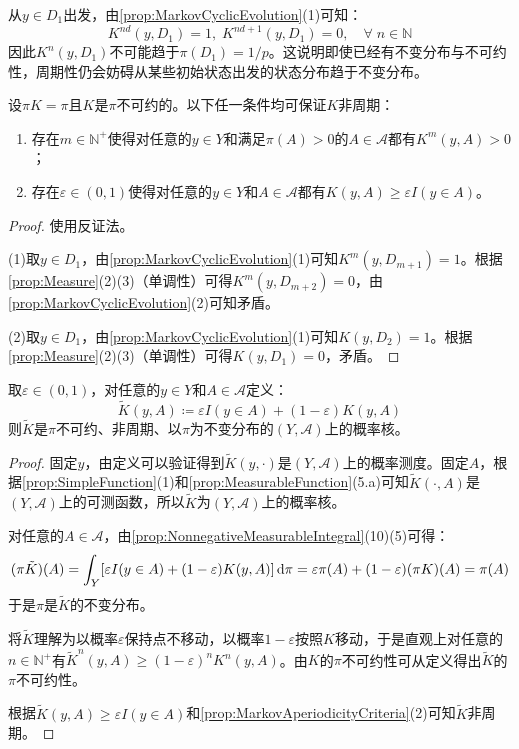 从$y\in D_1$出发，由\cref{prop:MarkovCyclicEvolution}(1)可知：
\begin{equation*}
	K^{nd}(y,D_1)=1,\;K^{nd+1}(y,D_1)=0,\quad\forall\;n\in\mathbb{N}
\end{equation*}
因此$K^n(y,D_1)$不可能趋于$\pi(D_1)=1/p$。这说明即使已经有不变分布与不可约性，周期性仍会妨碍从某些初始状态出发的状态分布趋于不变分布。
\begin{property}\label{prop:MarkovAperiodicityCriteria}
	设$\pi K=\pi$且$K$是$\pi$不可约的。以下任一条件均可保证$K$非周期：
	\begin{enumerate}
		\item 存在$m\in\mathbb{N}^+$使得对任意的$y\in Y$和满足$\pi(A)>0$的$A\in\mathscr{A}$都有$K^m(y,A)>0$；
		\item 存在$\varepsilon\in(0,1)$使得对任意的$y\in Y$和$A\in\mathscr{A}$都有$K(y,A)\geqslant\varepsilon I(y\in A)$。
	\end{enumerate}
\end{property}
\begin{proof}
	使用反证法。\par
	(1)取$y\in D_1$，由\cref{prop:MarkovCyclicEvolution}(1)可知$K^m(y,D_{m+1})=1$。根据\cref{prop:Measure}(2)(3)（单调性）可得$K^m(y,D_{m+2})=0$，由\cref{prop:MarkovCyclicEvolution}(2)可知矛盾。\par
	(2)取$y\in D_1$，由\cref{prop:MarkovCyclicEvolution}(1)可知$K(y,D_2)=1$。根据\cref{prop:Measure}(2)(3)（单调性）可得$K(y,D_1)=0$，矛盾。
\end{proof}
\begin{theorem}\label{theo:MarkovLazyKernel}
	取$\varepsilon\in(0,1)$，对任意的$y\in Y$和$A\in\mathscr{A}$定义：
	\begin{equation*}
		\tilde{K}(y,A)\coloneq\varepsilon I(y\in A)+(1-\varepsilon)K(y,A)
	\end{equation*}
	则$\tilde{K}$是$\pi$不可约、非周期、以$\pi$为不变分布的$(Y,\mathscr{A})$上的概率核。
\end{theorem}
\begin{proof}
	固定$y$，由定义可以验证得到$\tilde{K}(y,\cdot)$是$(Y,\mathscr{A})$上的概率测度。固定$A$，根据\cref{prop:SimpleFunction}(1)和\cref{prop:MeasurableFunction}(5.a)可知$\tilde{K}(\cdot,A)$是$(Y,\mathscr{A})$上的可测函数，所以$\tilde{K}$为$(Y,\mathscr{A})$上的概率核。\par
	对任意的$A\in\mathscr{A}$，由\cref{prop:NonnegativeMeasurableIntegral}(10)(5)可得：
	\begin{equation*}
		(\pi\tilde{K})(A)=\int_{Y}[\varepsilon I(y\in A)+(1-\varepsilon)K(y,A)]\mathop{}\!\mathrm{d}\pi=\varepsilon\pi(A)+(1-\varepsilon)(\pi K)(A)=\pi(A)
	\end{equation*}
	于是$\pi$是$\tilde{K}$的不变分布。\par
	将$\tilde{K}$理解为以概率$\varepsilon$保持点不移动，以概率$1-\varepsilon$按照$K$移动，于是直观上对任意的$n\in\mathbb{N}^+$有$\tilde{K}^n(y,A)\geqslant(1-\varepsilon)^nK^n(y,A)$。由$K$的$\pi$不可约性可从定义得出$\tilde{K}$的$\pi$不可约性。\par
	根据$\tilde{K}(y,A)\geqslant\varepsilon I(y\in A)$和\cref{prop:MarkovAperiodicityCriteria}(2)可知$\tilde{K}$非周期。
\end{proof}
